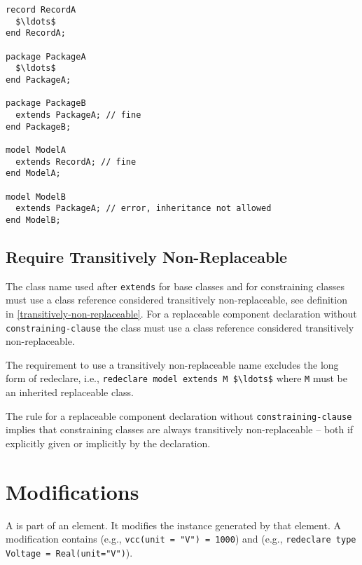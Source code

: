 \begin{example}
\begin{lstlisting}[language=modelica]
record RecordA
  $\ldots$
end RecordA;

package PackageA
  $\ldots$
end PackageA;

package PackageB
  extends PackageA; // fine
end PackageB;

model ModelA
  extends RecordA; // fine
end ModelA;

model ModelB
  extends PackageA; // error, inheritance not allowed
end ModelB;
\end{lstlisting}
\end{example}


\subsection{Require Transitively Non-Replaceable}\label{restrictions-on-base-classes-and-constraining-types-to-be-transitively-non-replaceable}\label{require-transitively-non-replaceable}

The class name used after \lstinline!extends! for base classes and for constraining classes must use a class reference considered transitively non-replaceable, see definition in \cref{transitively-non-replaceable}.
For a replaceable component declaration without \lstinline[language=grammar]!constraining-clause! the class must use a class reference considered transitively non-replaceable.

\begin{nonnormative}
The requirement to use a transitively non-replaceable name excludes the long form of redeclare, i.e., \lstinline!redeclare model extends M $\ldots$! where \lstinline!M! must be an inherited replaceable class.
\end{nonnormative}

\begin{nonnormative}
The rule for a replaceable component declaration without \lstinline[language=grammar]!constraining-clause! implies that constraining classes are always transitively non-replaceable -- both if explicitly given or implicitly by the declaration.
\end{nonnormative}


\section{Modifications}\label{modifications}

A  is part of an element.
It modifies the instance generated by that element.
A modification contains  (e.g., \lstinline!vcc(unit = "V") = 1000!) and  (e.g., \lstinline!redeclare type Voltage = Real(unit="V")!).

